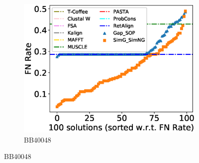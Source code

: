 \begin{figure}[!htbp]
\begin{adjustwidth}{-1.5cm}{-1cm}
\begin{subfigure}{0.22\textwidth}
			\includegraphics[width=\columnwidth]{Figure/summary/precomputedInit/Balibase/BB40048_fnrate_density_single_run}
			\caption{BB40048}
		\end{subfigure}
		

\end{adjustwidth}
\end{figure}
